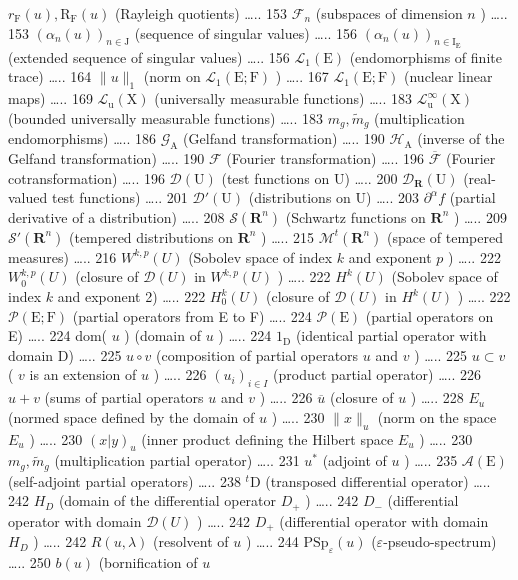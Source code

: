 \(r_{\mathrm{F}}(u), \mathrm{R}_{\mathrm{F}}(u)\) (Rayleigh quotients) \ldots.. 153 \(\mathcal{F}_n\) (subspaces of dimension \(n\) ) \ldots.. 153 \((\alpha_n(u))_{n \in \mathrm{J}}\) (sequence of singular values) \ldots.. 156 \((\alpha_n(u))_{n \in \mathrm{I_E}}\) (extended sequence of singular values) \ldots.. 156 \(\mathcal{L}_1(\mathrm{E})\) (endomorphisms of finite trace) \ldots.. 164 \(\|u\|_1\) (norm on \(\mathcal{L}_1(\mathrm{E};\mathrm{F})\) ) \ldots.. 167 \(\mathcal{L}_1(\mathrm{E};\mathrm{F})\) (nuclear linear maps) \ldots.. 169 \(\mathcal{L}_{\mathrm{u}}(\mathrm{X})\) (universally measurable functions) \ldots.. 183 \(\mathcal{L}_{\mathrm{u}}^{\infty}(\mathrm{X})\) (bounded universally measurable functions) \ldots.. 183 \(m_g, \widetilde{m}_g\) (multiplication endomorphisms) \ldots.. 186 \(\mathcal{G}_{\mathrm{A}}\) (Gelfand transformation) \ldots.. 190 \(\mathcal{H}_{\mathrm{A}}\) (inverse of the Gelfand transformation) \ldots.. 190 \(\mathcal{F}\) (Fourier transformation) \ldots.. 196 \(\overline{\mathcal{F}}\) (Fourier cotransformation) \ldots.. 196 \(\mathcal{D}(\mathrm{U})\) (test functions on U) \ldots.. 200 \(\mathcal{D}_{\mathbf{R}}(\mathrm{U})\) (real-valued test functions) \ldots.. 201 \(\mathcal{D}'(\mathrm{U})\) (distributions on U) \ldots.. 203 \(\partial^\alpha f\) (partial derivative of a distribution) \ldots.. 208 \(\mathcal{S}(\mathbf{R}^n)\) (Schwartz functions on \(\mathbf{R}^n\) ) \ldots.. 209 \(\mathcal{S}'(\mathbf{R}^n)\) (tempered distributions on \(\mathbf{R}^n\) ) \ldots.. 215 \(\mathcal{M}^t(\mathbf{R}^n)\) (space of tempered measures) \ldots.. 216 \(W^{k,p}(U)\) (Sobolev space of index \(k\) and exponent \(p\) ) \ldots.. 222 \(W_0^{k,p}(U)\) (closure of \(\mathcal{D}(U)\) in \(W^{k,p}(U)\) ) \ldots.. 222 \(H^k(U)\) (Sobolev space of index \(k\) and exponent 2) \ldots.. 222 \(H_0^k(U)\) (closure of \(\mathcal{D}(U)\) in \(H^k(U)\) ) \ldots.. 222 \(\mathcal{P}(\mathrm{E};\mathrm{F})\) (partial operators from E to F) \ldots.. 224 \(\mathcal{P}(\mathrm{E})\) (partial operators on E) \ldots.. 224 dom( \(u\) ) (domain of \(u\) ) \ldots.. 224 \(1_{\mathrm{D}}\) (identical partial operator with domain D) \ldots.. 225 \(u \circ v\) (composition of partial operators \(u\) and \(v\) ) \ldots.. 225 \(u \subset v\) ( \(v\) is an extension of \(u\) ) \ldots.. 226 \((u_i)_{i \in I}\) (product partial operator) \ldots.. 226 \(u + v\) (sums of partial operators \(u\) and \(v\) ) \ldots.. 226 \(\overline{u}\) (closure of \(u\) ) \ldots.. 228 \(E_u\) (normed space defined by the domain of \(u\) ) \ldots.. 230 \(\|x\|_u\) (norm on the space \(E_u\) ) \ldots.. 230 \((x | y)_u\) (inner product defining the Hilbert space \(E_u\) ) \ldots.. 230 \(m_g, \widetilde{m}_g\) (multiplication partial operator) \ldots.. 231 \(u^*\) (adjoint of \(u\) ) \ldots.. 235 \(\mathcal{A}(\mathrm{E})\) (self-adjoint partial operators) \ldots.. 238 \(^t\mathrm{D}\) (transposed differential operator) \ldots.. 242 \(H_D\) (domain of the differential operator \(D_+\) ) \ldots.. 242 \(D_-\) (differential operator with domain \(\mathcal{D}(U)\) ) \ldots.. 242 \(D_+\) (differential operator with domain \(H_D\) ) \ldots.. 242 \(R(u,\lambda)\) (resolvent of \(u\) ) \ldots.. 244 \(\mathrm{PSp}_{\varepsilon}(u)\) (\(\varepsilon\)-pseudo-spectrum) \ldots.. 250 \(b(u)\) (bornification of \(u\) 